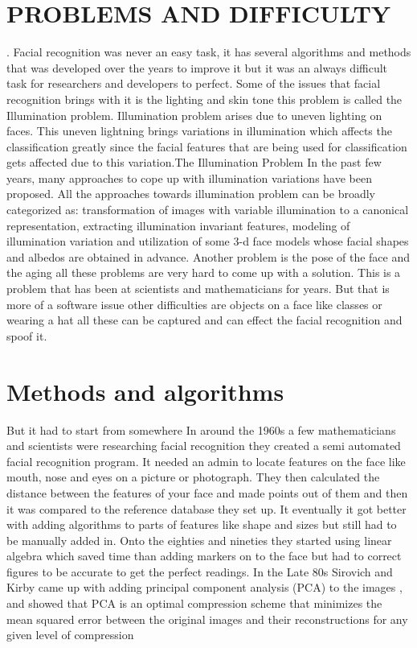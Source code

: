 \documentclass[report]{IEEEtran}
\begin{document}
\section{
PROBLEMS AND DIFFICULTY
}.\newline
Facial recognition was never an easy task, it has several algorithms and methods that  was developed over the years  to improve it but it was an always difficult task for researchers and developers to perfect. Some of the issues that facial recognition brings with it is the lighting and skin tone this problem is called the Illumination problem. Illumination problem arises due to uneven lighting on faces. This uneven lightning brings variations in illumination which affects the classification greatly since the facial features that are being used for classification gets affected due to this variation.The Illumination Problem In the past few years, many approaches to cope up
with illumination variations have been proposed. All the approaches towards illumination problem can be broadly
categorized as: transformation of images with variable illumination to a canonical representation, extracting
illumination invariant features, modeling of illumination variation and utilization of some 3-d face models whose
facial shapes and albedos are obtained in advance\cite{Illumation}.
Another problem is the pose of the face and the aging all these problems are very hard to come up with a solution. This is a problem that has been at scientists and mathematicians for years. 
But that is more of a software issue other difficulties are objects on a face like classes or wearing a hat all these can be captured and can effect the facial recognition and spoof it\cite{Illumation}. 

\section{Methods and algorithms }
But it had to start from somewhere In around the 1960s a few mathematicians and scientists were researching facial recognition they created a semi automated facial recognition program. It needed an admin to locate features on the face like mouth, nose and eyes on a picture or photograph. They then calculated the distance between the features of your face and made points out of them and then it was compared to the reference database they set up. It eventually it got better with adding algorithms to parts of features like shape and sizes but still had to be manually added in. Onto the eighties and nineties they started using linear algebra which saved time than adding markers on to the face but had to correct figures to be accurate  to get the perfect readings. In the Late 80s Sirovich and Kirby came up with adding principal component analysis (PCA) to the images , and showed that PCA is an optimal compression scheme that minimizes the mean squared error between the original images and their reconstructions for any given level of compression
\end{document}
